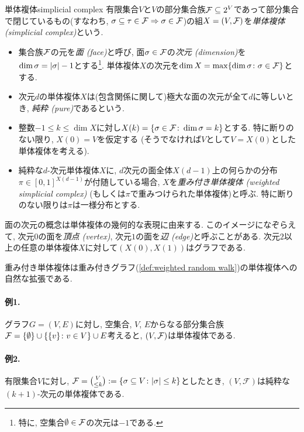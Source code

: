 \begin{definition}{単体複体}{simplicial complex}
有限集合$V$と$V$の部分集合族$\F\subseteq 2^V$であって部分集合で閉じているもの(すなわち, $\sigma\subseteq \tau \in \F \Rightarrow \sigma\in \F$)の組$X=(V,\F)$を\emph{単体複体 (simplicial complex)}という.
\begin{itemize}
\item 集合族$\F$の元を\emph{面 (face)}と呼び,
面$\sigma \in \F$の\emph{次元 (dimension)}を$\dim \sigma = \abs{\sigma} - 1$とする\footnote{特に, 空集合$\emptyset \in \F$の次元は$-1$である.}.
単体複体$X$の次元を$\dim X = \max\cbra{\dim \sigma \colon \sigma \in \F}$とする.

\item 次元$d$の単体複体$X$は(包含関係に関して)極大な面の次元が全て$d$に等しいとき, \emph{純粋 (pure)}であるという.

\item 整数$-1 \le k \le \dim X$に対し$X(k) = \cbra*{\sigma \in \F\colon \dim \sigma = k }$とする.
特に断りのない限り, $X(0)=V$を仮定する
(そうでなければ$V$として$V=X(0)$とした単体複体を考える).

\item 純粋な$d$-次元単体複体$X$に, $d$次元の面全体$X(d-1)$上の何らかの分布$\pi \in [0,1]^{X(d-1)}$が付随している場合, $X$を\emph{重み付き単体複体 (weighted simplicial complex)} (もしくは$\pi$で重みつけられた単体複体)と呼ぶ. 特に断りのない限りは$\pi$は一様分布とする.
\end{itemize}
\end{definition}
面の次元の概念は単体複体の幾何的な表現に由来する.
このイメージになぞらえて,
次元$0$の面を\emph{頂点 (vertex)}, 次元$1$の面を\emph{辺 (edge)}と呼ぶことがある.
次元$2$以上の任意の単体複体$X$に対して$(X(0),X(1))$はグラフである.

重み付き単体複体は重み付きグラフ(\cref{def:weighted random walk})の単体複体への自然な拡張である.

\paragraph*{例1.}
グラフ$G=(V,E)$に対し, 空集合, $V$, $E$からなる部分集合族
$\F = \{\emptyset\} \cup \cbra*{\{v\}\colon v \in V} \cup E$考えると,
$(V,\F)$は単体複体である.

\paragraph*{例2.}
有限集合$V$に対し,
$\F = \binom{V}{\le k} \defeq \cbra*{ \sigma \subseteq V \colon |\sigma|\le k}$としたとき, $(V,\mathcal{F})$は純粋な$(k+1)$-次元の単体複体である.

